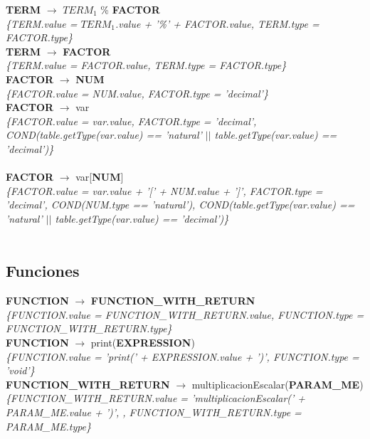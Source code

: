 \documentclass[10pt,a4paper]{article}
\begin{document}
\textbf{TERM} $\rightarrow$ \textbf{$TERM_{1}$} \% \textbf{FACTOR}  \\
\textit{\{TERM.value = $TERM_{1}$.value + '\%' + FACTOR.value, TERM.type = FACTOR.type\}} \\

\textbf{TERM} $\rightarrow$ \textbf{FACTOR} \\
\textit{\{TERM.value = FACTOR.value, TERM.type = FACTOR.type\}} \\

\textbf{FACTOR} $\rightarrow$ \textbf{NUM}   \\
\textit{\{FACTOR.value = NUM.value, FACTOR.type = 'decimal'\}} \\

\textbf{FACTOR} $\rightarrow$ var  \\ 
\textit{\{FACTOR.value = var.value, FACTOR.type = 'decimal', COND(table.getType(var.value) == 'natural' $||$ table.getType(var.value) == 'decimal')\}}  \\ 
\\


\textbf{FACTOR} $\rightarrow$ var[\textbf{NUM}]  \\ 
\textit{\{FACTOR.value = var.value + '[' + NUM.value + ']', FACTOR.type = 'decimal', COND(NUM.type == 'natural'), COND(table.getType(var.value) == 'natural' $||$ table.getType(var.value) == 'decimal')\}}  \\ 
\\




\subsection{Funciones}
\textbf{FUNCTION} $\rightarrow$ \textbf{FUNCTION\_WITH\_RETURN} \\
\textit{\{FUNCTION.value =  FUNCTION\_WITH\_RETURN.value, FUNCTION.type = FUNCTION\_WITH\_RETURN.type\}} \\

\textbf{FUNCTION} $\rightarrow$ print(\textbf{EXPRESSION}) \\   
\textit{\{FUNCTION.value =  'print(' + EXPRESSION.value + ')', FUNCTION.type = 'void'\}} \\

\textbf{FUNCTION\_WITH\_RETURN} $\rightarrow$ multiplicacionEscalar(\textbf{PARAM\_ME}) \\ 
\textit{\{FUNCTION\_WITH\_RETURN.value =  'multiplicacionEscalar(' + PARAM\_ME.value + ')', , FUNCTION\_WITH\_RETURN.type = PARAM\_ME.type\}} \\
\end{document}
